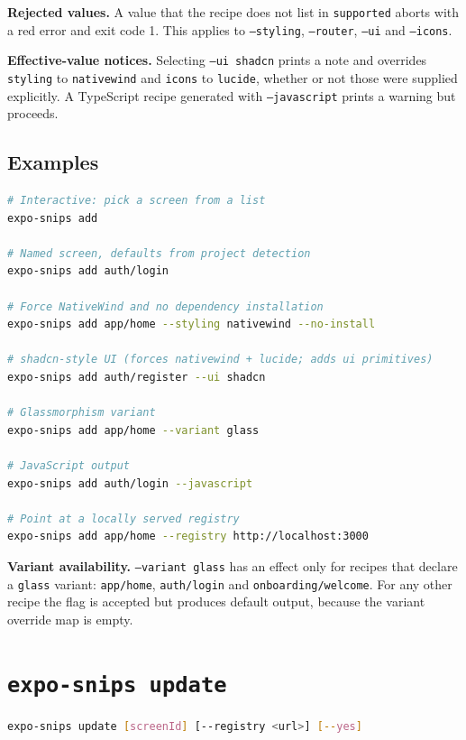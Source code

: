 \textbf{Rejected values.} A value that the recipe does not list in
\texttt{supported} aborts with a red error and exit code 1. This applies to
\texttt{--styling}, \texttt{--router}, \texttt{--ui} and \texttt{--icons}.

\textbf{Effective-value notices.} Selecting \texttt{--ui shadcn} prints a note and
overrides \texttt{styling} to \texttt{nativewind} and \texttt{icons} to
\texttt{lucide}, whether or not those were supplied explicitly. A TypeScript
recipe generated with \texttt{--javascript} prints a warning but proceeds.

\subsection*{Examples}

\begin{lstlisting}[language=bash]
# Interactive: pick a screen from a list
expo-snips add

# Named screen, defaults from project detection
expo-snips add auth/login

# Force NativeWind and no dependency installation
expo-snips add app/home --styling nativewind --no-install

# shadcn-style UI (forces nativewind + lucide; adds ui primitives)
expo-snips add auth/register --ui shadcn

# Glassmorphism variant
expo-snips add app/home --variant glass

# JavaScript output
expo-snips add auth/login --javascript

# Point at a locally served registry
expo-snips add app/home --registry http://localhost:3000
\end{lstlisting}

\textbf{Variant availability.} \texttt{--variant glass} has an effect only for
recipes that declare a \texttt{glass} variant: \texttt{app/home},
\texttt{auth/login} and \texttt{onboarding/welcome}. For any other recipe the flag
is accepted but produces default output, because the variant override map is empty.

\section{\texttt{expo-snips update}}

\begin{lstlisting}[language=bash]
expo-snips update [screenId] [--registry <url>] [--yes]
\end{lstlisting}

